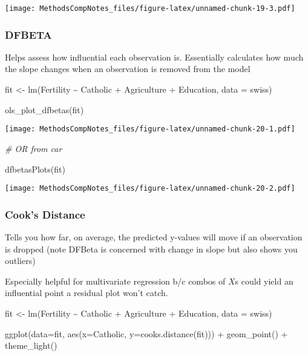 \documentclass[
]{article}
\newenvironment{Shaded}{\begin{snugshade}}{\end{snugshade}}
\newcommand{\AttributeTok}[1]{\textcolor[rgb]{0.77,0.63,0.00}{#1}}
\newcommand{\CommentTok}[1]{\textcolor[rgb]{0.56,0.35,0.01}{\textit{#1}}}
\newcommand{\FunctionTok}[1]{\textcolor[rgb]{0.00,0.00,0.00}{#1}}
\newcommand{\NormalTok}[1]{#1}
\newcommand{\OtherTok}[1]{\textcolor[rgb]{0.56,0.35,0.01}{#1}}
\newcommand{\SpecialCharTok}[1]{\textcolor[rgb]{0.00,0.00,0.00}{#1}}
\begin{document}
\texttt{[image: MethodsCompNotes\_files/figure-latex/unnamed-chunk-19-3.pdf]}

\hypertarget{dfbeta}{%
\subsubsection{DFBETA}\label{dfbeta}}

Helps assess how influential each observation is. Essentially calculates
how much the slope changes when an observation is removed from the model

\begin{Shaded}
\begin{Highlighting}[]
\NormalTok{fit }\OtherTok{\textless{}{-}} \FunctionTok{lm}\NormalTok{(Fertility }\SpecialCharTok{\textasciitilde{}}\NormalTok{ Catholic }\SpecialCharTok{+}\NormalTok{ Agriculture }\SpecialCharTok{+}\NormalTok{ Education, }\AttributeTok{data =}\NormalTok{ swiss)}

\FunctionTok{ols\_plot\_dfbetas}\NormalTok{(fit)}
\end{Highlighting}
\end{Shaded}

\texttt{[image: MethodsCompNotes\_files/figure-latex/unnamed-chunk-20-1.pdf]}

\begin{Shaded}
\begin{Highlighting}[]
\CommentTok{\# OR from car}

\FunctionTok{dfbetasPlots}\NormalTok{(fit)}
\end{Highlighting}
\end{Shaded}

\texttt{[image: MethodsCompNotes\_files/figure-latex/unnamed-chunk-20-2.pdf]}

\hypertarget{cooks-distance}{%
\subsubsection{Cook's Distance}\label{cooks-distance}}

Tells you how far, on average, the predicted y-values will move if an
observation is dropped (note DFBeta is concerned with change in slope
but also shows you outliers)

Especially helpful for multivariate regression b/c combos of \(X\)s
could yield an influential point a residual plot won't catch.

\begin{Shaded}
\begin{Highlighting}[]
\NormalTok{fit }\OtherTok{\textless{}{-}} \FunctionTok{lm}\NormalTok{(Fertility }\SpecialCharTok{\textasciitilde{}}\NormalTok{ Catholic }\SpecialCharTok{+}\NormalTok{ Agriculture }\SpecialCharTok{+}\NormalTok{ Education, }\AttributeTok{data =}\NormalTok{ swiss)}

\FunctionTok{ggplot}\NormalTok{(}\AttributeTok{data=}\NormalTok{fit, }\FunctionTok{aes}\NormalTok{(}\AttributeTok{x=}\NormalTok{Catholic, }\AttributeTok{y=}\FunctionTok{cooks.distance}\NormalTok{(fit))) }\SpecialCharTok{+}
  \FunctionTok{geom\_point}\NormalTok{() }\SpecialCharTok{+}
  \FunctionTok{theme\_light}\NormalTok{()}
\end{Highlighting}
\end{Shaded}
\end{document}
